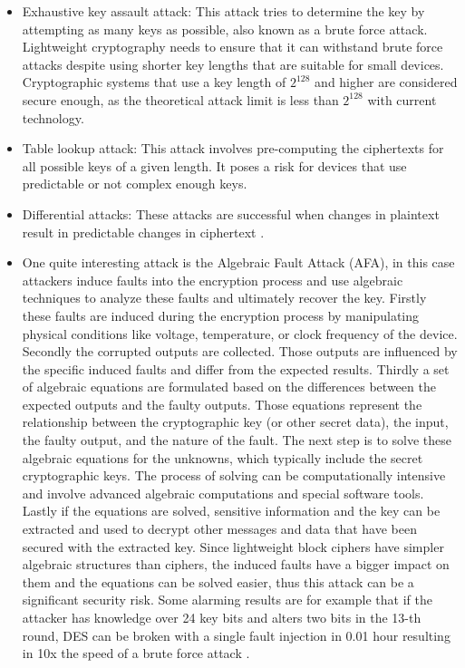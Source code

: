 \documentclass[a4paper,11pt, twoside]{article}
\begin{document}
\begin{itemize}
    \item Exhaustive key assault attack: This attack tries to determine the key by attempting as many keys as possible, also known as a brute force attack. Lightweight cryptography needs to ensure that it can withstand brute force attacks despite using shorter key lengths that are suitable for small devices. Cryptographic systems that use a key length of $2^{128}$ and higher are considered secure enough, as the theoretical attack limit is less than $2^{128}$ with current technology.
    \item Table lookup attack: This attack involves pre-computing the ciphertexts for all possible keys of a given length. It poses a risk for devices that use predictable or not complex enough keys.
    \item Differential attacks: These attacks are successful when changes in plaintext result in predictable changes in ciphertext \cite{ekwueme2024lightweight}.
    \item One quite interesting attack is the Algebraic Fault Attack (AFA), in this case attackers induce faults into the encryption process and use algebraic techniques to analyze these faults and ultimately recover the key. Firstly these faults are induced during the encryption process by manipulating physical conditions like voltage, temperature, or clock frequency of the device. Secondly the corrupted outputs are collected. Those outputs are influenced by the specific induced faults and differ from the expected results. Thirdly a set of algebraic equations are formulated based on the differences between the expected outputs and the faulty outputs. Those equations represent the relationship between the cryptographic key (or other secret data), the input, the faulty output, and the nature of the fault. The next step is to solve these algebraic equations for the unknowns, which typically include the secret cryptographic keys. The process of solving can be computationally intensive and involve advanced algebraic computations and special software tools. Lastly if the equations are solved, sensitive information and the key can be extracted and used to decrypt other messages and data that have been secured with the extracted key. Since lightweight block ciphers have simpler algebraic structures than ciphers, the induced faults have a bigger impact on them and the equations can be solved easier, thus this attack can be a significant security risk. Some alarming results are for example that if the attacker has knowledge over 24 key bits and alters two bits in the 13-th round, DES can be broken with a single fault injection in 0.01 hour resulting in 10x the speed of a brute force attack \cite{zhang2016framework}.

\end{itemize}
\end{document}
